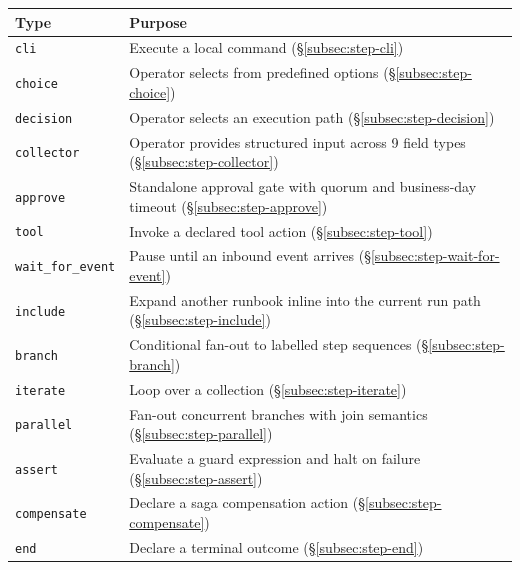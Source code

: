 \begin{center}
\begin{tabular}{lp{8cm}}
\hline
\textbf{Type} & \textbf{Purpose} \\
\hline
\texttt{cli}              & Execute a local command (\S\ref{subsec:step-cli}) \\
\texttt{choice}           & Operator selects from predefined options (\S\ref{subsec:step-choice}) \\
\texttt{decision}         & Operator selects an execution path (\S\ref{subsec:step-decision}) \\
\texttt{collector}        & Operator provides structured input across 9 field types (\S\ref{subsec:step-collector}) \\
\texttt{approve}          & Standalone approval gate with quorum and business-day timeout (\S\ref{subsec:step-approve}) \\
\texttt{tool}             & Invoke a declared tool action (\S\ref{subsec:step-tool}) \\
\texttt{wait\_for\_event} & Pause until an inbound event arrives (\S\ref{subsec:step-wait-for-event}) \\
\texttt{include}          & Expand another runbook inline into the current run path (\S\ref{subsec:step-include}) \\
\texttt{branch}           & Conditional fan-out to labelled step sequences (\S\ref{subsec:step-branch}) \\
\texttt{iterate}          & Loop over a collection (\S\ref{subsec:step-iterate}) \\
\texttt{parallel}         & Fan-out concurrent branches with join semantics (\S\ref{subsec:step-parallel}) \\
\texttt{assert}           & Evaluate a guard expression and halt on failure (\S\ref{subsec:step-assert}) \\
\texttt{compensate}       & Declare a saga compensation action (\S\ref{subsec:step-compensate}) \\
\texttt{end}              & Declare a terminal outcome (\S\ref{subsec:step-end}) \\
\hline
\end{tabular}
\end{center}

